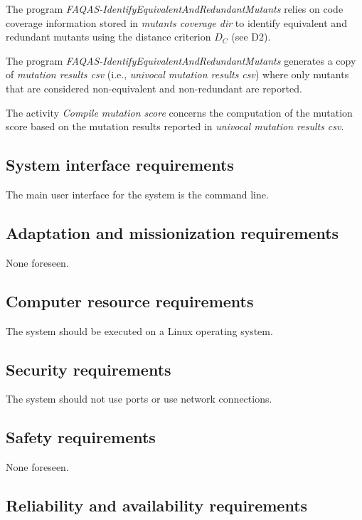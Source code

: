 \RQ{} The program \emph{FAQAS-IdentifyEquivalentAndRedundantMutants} relies on code coverage information stored in \emph{mutants coverage dir} to identify equivalent and redundant mutants using the distance criterion $D_C$ (see D2).

\RQ{} The program \emph{FAQAS-IdentifyEquivalentAndRedundantMutants} generates a copy of \emph{mutation results csv} (i.e., \emph{univocal mutation results csv}) where only mutants that are considered non-equivalent and non-redundant are reported.

\RQ{} The activity \emph{Compile mutation score} concerns the computation of the mutation score based on the mutation results reported in \emph{univocal mutation results csv}.

\subsection{System interface requirements}

\RQ{} The main user interface for the system is the command line.

\subsection{Adaptation and missionization requirements }

None foreseen.

\subsection{Computer resource requirements}

\RQ{} The system should be executed on a Linux operating system.

\subsection{Security requirements }

\RQ{} The system should not use ports or use network connections.

\subsection{Safety requirements}

None foreseen.

\subsection{Reliability and availability requirements}

